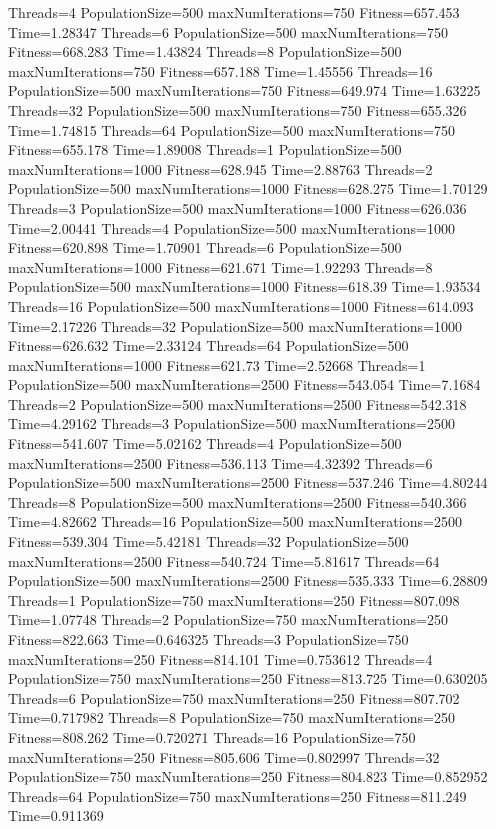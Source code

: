 \documentclass[10pt,letterpaper]{article}
\begin{document}
Threads=4 PopulationSize=500 maxNumIterations=750 Fitness=657.453 Time=1.28347
Threads=6 PopulationSize=500 maxNumIterations=750 Fitness=668.283 Time=1.43824
Threads=8 PopulationSize=500 maxNumIterations=750 Fitness=657.188 Time=1.45556
Threads=16 PopulationSize=500 maxNumIterations=750 Fitness=649.974 Time=1.63225
Threads=32 PopulationSize=500 maxNumIterations=750 Fitness=655.326 Time=1.74815
Threads=64 PopulationSize=500 maxNumIterations=750 Fitness=655.178 Time=1.89008
Threads=1 PopulationSize=500 maxNumIterations=1000 Fitness=628.945 Time=2.88763
Threads=2 PopulationSize=500 maxNumIterations=1000 Fitness=628.275 Time=1.70129
Threads=3 PopulationSize=500 maxNumIterations=1000 Fitness=626.036 Time=2.00441
Threads=4 PopulationSize=500 maxNumIterations=1000 Fitness=620.898 Time=1.70901
Threads=6 PopulationSize=500 maxNumIterations=1000 Fitness=621.671 Time=1.92293
Threads=8 PopulationSize=500 maxNumIterations=1000 Fitness=618.39 Time=1.93534
Threads=16 PopulationSize=500 maxNumIterations=1000 Fitness=614.093 Time=2.17226
Threads=32 PopulationSize=500 maxNumIterations=1000 Fitness=626.632 Time=2.33124
Threads=64 PopulationSize=500 maxNumIterations=1000 Fitness=621.73 Time=2.52668
Threads=1 PopulationSize=500 maxNumIterations=2500 Fitness=543.054 Time=7.1684
Threads=2 PopulationSize=500 maxNumIterations=2500 Fitness=542.318 Time=4.29162
Threads=3 PopulationSize=500 maxNumIterations=2500 Fitness=541.607 Time=5.02162
Threads=4 PopulationSize=500 maxNumIterations=2500 Fitness=536.113 Time=4.32392
Threads=6 PopulationSize=500 maxNumIterations=2500 Fitness=537.246 Time=4.80244
Threads=8 PopulationSize=500 maxNumIterations=2500 Fitness=540.366 Time=4.82662
Threads=16 PopulationSize=500 maxNumIterations=2500 Fitness=539.304 Time=5.42181
Threads=32 PopulationSize=500 maxNumIterations=2500 Fitness=540.724 Time=5.81617
Threads=64 PopulationSize=500 maxNumIterations=2500 Fitness=535.333 Time=6.28809
Threads=1 PopulationSize=750 maxNumIterations=250 Fitness=807.098 Time=1.07748
Threads=2 PopulationSize=750 maxNumIterations=250 Fitness=822.663 Time=0.646325
Threads=3 PopulationSize=750 maxNumIterations=250 Fitness=814.101 Time=0.753612
Threads=4 PopulationSize=750 maxNumIterations=250 Fitness=813.725 Time=0.630205
Threads=6 PopulationSize=750 maxNumIterations=250 Fitness=807.702 Time=0.717982
Threads=8 PopulationSize=750 maxNumIterations=250 Fitness=808.262 Time=0.720271
Threads=16 PopulationSize=750 maxNumIterations=250 Fitness=805.606 Time=0.802997
Threads=32 PopulationSize=750 maxNumIterations=250 Fitness=804.823 Time=0.852952
Threads=64 PopulationSize=750 maxNumIterations=250 Fitness=811.249 Time=0.911369
\end{document}
